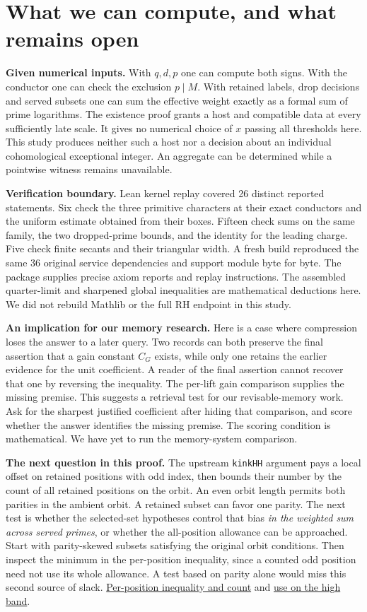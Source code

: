 \documentclass[12pt,letterpaper]{article}
\newcommand{\orig}[3]{\href{https://github.com/nousentllc/riemann-hypothesis/blob/40e56bab026552e089d7afcfeff08d2defb9c005/src/#1.lean\#L#2}{#3}}
\newcommand{\para}[1]{\par\medskip\noindent\textbf{#1}\quad}
\newcommand{\pagepart}[1]{\clearpage\section{#1}}
\begin{document}
\pagepart{What we can compute, and what remains open}
\para{Given numerical inputs.} With \(q,d,p\) one can compute both signs. With the conductor one can check the exclusion \(p\mid M\). With retained labels, drop decisions and served subsets one can sum the effective weight exactly as a formal sum of prime logarithms. The existence proof grants a host and compatible data at every sufficiently late scale. It gives no numerical choice of \(x\) passing all thresholds here. This study produces neither such a host nor a decision about an individual cohomological exceptional integer. An aggregate can be determined while a pointwise witness remains unavailable.

\para{Verification boundary.} Lean kernel replay covered 26 distinct reported statements. Six check the three primitive characters at their exact conductors and the uniform estimate obtained from their boxes. Fifteen check sums on the same family, the two dropped-prime bounds, and the identity for the leading charge. Five check finite secants and their triangular width. A fresh build reproduced the same 36 original service dependencies and support module byte for byte. The package supplies precise axiom reports and replay instructions. The assembled quarter-limit and sharpened global inequalities are mathematical deductions here. We did not rebuild Mathlib or the full RH endpoint in this study.

\para{An implication for our memory research.} Here is a case where compression loses the answer to a later query. Two records can both preserve the final assertion that a gain constant \(C_G\) exists, while only one retains the earlier evidence for the unit coefficient. A reader of the final assertion cannot recover that one by reversing the inequality. The per-lift gain comparison supplies the missing premise. This suggests a retrieval test for our revisable-memory work. Ask for the sharpest justified coefficient after hiding that comparison, and score whether the answer identifies the missing premise. The scoring condition is mathematical. We have yet to run the memory-system comparison.

\para{The next question in this proof.} The upstream \texttt{kinkHH} argument pays a local offset on retained positions with odd index, then bounds their number by the count of all retained positions on the orbit. An even orbit length permits both parities in the ambient orbit. A retained subset can favor one parity. The next test is whether the selected-set hypotheses control that bias \emph{in the weighted sum across served primes}, or whether the all-position allowance can be approached. Start with parity-skewed subsets satisfying the original orbit conditions. Then inspect the minimum in the per-position inequality, since a counted odd position need not use its whole allowance. A test based on parity alone would miss this second source of slack. \orig{Formalism/SharpRestriction/GrowthBounds/LogarithmicSums/PartnerCountOfCentral}{399}{Per-position inequality and count} and \orig{Formalism/SharpRestriction/GrowthBounds/LogarithmicSums/PartnerCountOfCentral}{696}{use on the high band}.
\end{document}
